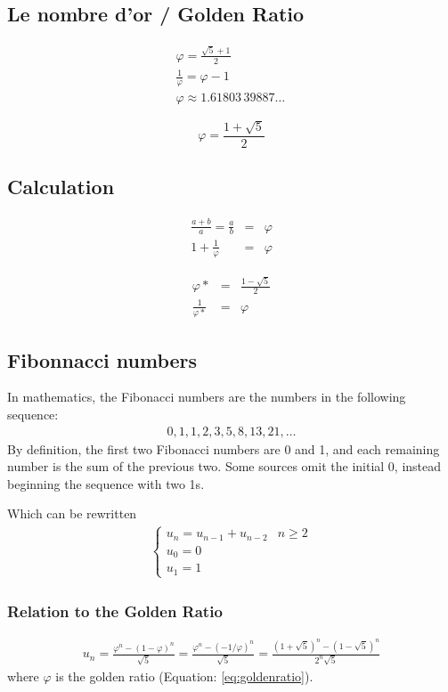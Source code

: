\subsection{Le nombre d'or / Golden Ratio}
\begin{eqnarray}
	\label{eq:goldenratio}
	\varphi=\frac{\sqrt5 + 1}{2}\\
	\frac{1}{\varphi}=\varphi - 1\\
	\varphi \approx 1.61803\,39887\ldots\,
\end{eqnarray}

\begin{equation}
    \varphi = \frac{1+\sqrt{5}}{2}
\end{equation}

\subsection{Calculation}
\begin{eqnarray}
    \frac{a+b}{a} = \frac{a}{b} &=& \varphi\\
    1 + \frac{1}{\varphi} &=& \varphi
\end{eqnarray}

\begin{eqnarray}
    \varphi* &=& \frac{1-\sqrt{5}}{2} \\
    \frac{1}{\varphi*} &=& \varphi
\end{eqnarray}

\subsection{Fibonnacci numbers}
In mathematics, the Fibonacci numbers are the numbers in the following sequence:
\begin{eqnarray}
	0, 1, 1, 2, 3, 5, 8, 13, 21,\dots
\end{eqnarray}
By definition, the first two Fibonacci numbers are 0 and 1, and each remaining number is the sum of the previous two. Some sources omit the initial 0, instead beginning the sequence with two 1s.

Which can be rewritten
\begin{eqnarray}
	\begin{cases}
		u_{n}=u_{n-1}+u_{n-2} & n\geq2\\
		u_0=0\\
		u_1=1
	\end{cases}
\end{eqnarray}

\subsubsection{Relation to the Golden Ratio}
\begin{eqnarray}
	u_n=\frac{\varphi^n-(1-\varphi)^n}{\sqrt{5}}=\frac{\varphi^n-(-1/\varphi)^n}{\sqrt{5}}=\frac{(1+\sqrt{5})^n-(1-\sqrt{5})^n}{2^n\sqrt{5}}
\end{eqnarray}
where $\varphi$ is the golden ratio (Equation: \ref{eq:goldenratio}).

